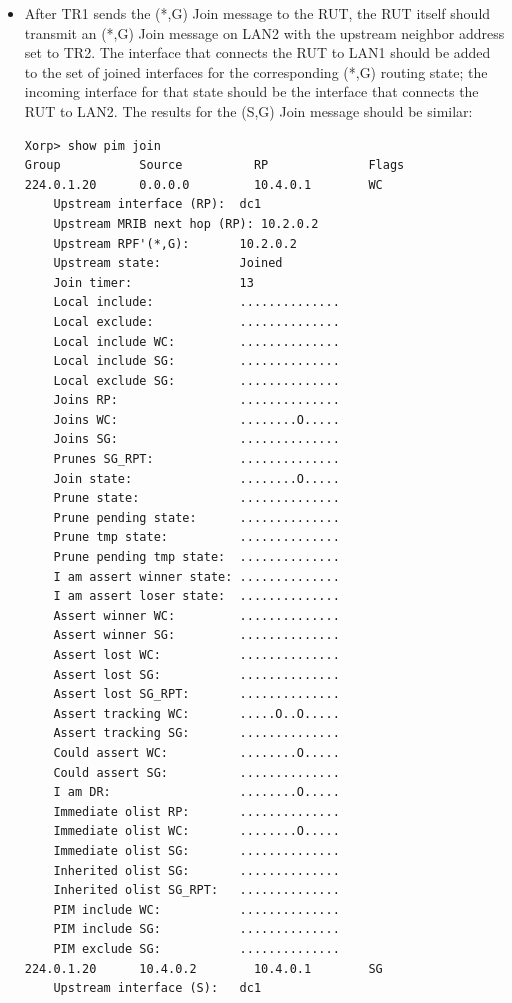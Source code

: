 \documentclass[11pt]{report}
\begin{document}
\begin{itemize}

  \item After TR1 sends the (*,G) Join message to the RUT, the RUT
  itself should transmit an (*,G) Join message on LAN2 with the upstream
  neighbor address set to TR2. The interface that connects the RUT to LAN1
  should be added to the set of joined interfaces for the corresponding
  (*,G) routing state; the incoming interface for that state should be the
  interface that connects the RUT to LAN2. The results for the (S,G) Join
  message should be similar:

\begin{verbatim}
Xorp> show pim join 
Group           Source          RP              Flags
224.0.1.20      0.0.0.0         10.4.0.1        WC   
    Upstream interface (RP):  dc1
    Upstream MRIB next hop (RP): 10.2.0.2
    Upstream RPF'(*,G):       10.2.0.2
    Upstream state:           Joined 
    Join timer:               13
    Local include:            ..............
    Local exclude:            ..............
    Local include WC:         ..............
    Local include SG:         ..............
    Local exclude SG:         ..............
    Joins RP:                 ..............
    Joins WC:                 ........O.....
    Joins SG:                 ..............
    Prunes SG_RPT:            ..............
    Join state:               ........O.....
    Prune state:              ..............
    Prune pending state:      ..............
    Prune tmp state:          ..............
    Prune pending tmp state:  ..............
    I am assert winner state: ..............
    I am assert loser state:  ..............
    Assert winner WC:         ..............
    Assert winner SG:         ..............
    Assert lost WC:           ..............
    Assert lost SG:           ..............
    Assert lost SG_RPT:       ..............
    Assert tracking WC:       .....O..O.....
    Assert tracking SG:       ..............
    Could assert WC:          ........O.....
    Could assert SG:          ..............
    I am DR:                  ........O.....
    Immediate olist RP:       ..............
    Immediate olist WC:       ........O.....
    Immediate olist SG:       ..............
    Inherited olist SG:       ..............
    Inherited olist SG_RPT:   ..............
    PIM include WC:           ..............
    PIM include SG:           ..............
    PIM exclude SG:           ..............
224.0.1.20      10.4.0.2        10.4.0.1        SG   
    Upstream interface (S):   dc1

\end{verbatim}
\end{itemize}
\end{document}
